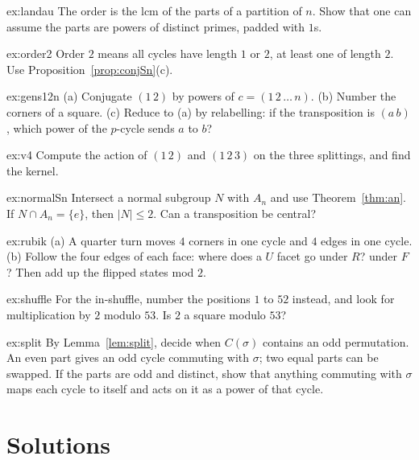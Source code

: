 \begin{hint}{ex:landau}
The order is the lcm of the parts of a partition of $n$. Show that one can assume the parts are powers of distinct primes, padded with $1$s.
\end{hint}
\begin{hint}{ex:order2}
Order $2$ means all cycles have length $1$ or $2$, at least one of length $2$. Use Proposition~\ref{prop:conjSn}(c).
\end{hint}
\begin{hint}{ex:gens12n}
(a) Conjugate $(1\,2)$ by powers of $c=(1\,2\,\dots\,n)$. (b) Number the corners of a square. (c) Reduce to (a) by relabelling: if the transposition is $(a\,b)$, which power of the $p$-cycle sends $a$ to $b$?
\end{hint}
\begin{hint}{ex:v4}
Compute the action of $(1\,2)$ and $(1\,2\,3)$ on the three splittings, and find the kernel.
\end{hint}
\begin{hint}{ex:normalSn}
Intersect a normal subgroup $N$ with $A_n$ and use Theorem~\ref{thm:an}. If $N\cap A_n=\{e\}$, then $|N|\le2$. Can a transposition be central?
\end{hint}
\begin{hint}{ex:rubik}
(a) A quarter turn moves $4$ corners in one cycle and $4$ edges in one cycle. (b) Follow the four edges of each face: where does a $U$ facet go under $R$? under $F$? Then add up the flipped states mod $2$.
\end{hint}
\begin{hint}{ex:shuffle}
For the in-shuffle, number the positions $1$ to $52$ instead, and look for multiplication by $2$ modulo $53$. Is $2$ a square modulo $53$?
\end{hint}
\begin{hint}{ex:split}
By Lemma~\ref{lem:split}, decide when $C(\sigma)$ contains an odd permutation. An even part gives an odd cycle commuting with $\sigma$; two equal parts can be swapped. If the parts are odd and distinct, show that anything commuting with $\sigma$ maps each cycle to itself and acts on it as a power of that cycle.
\end{hint}

\section{Solutions}

